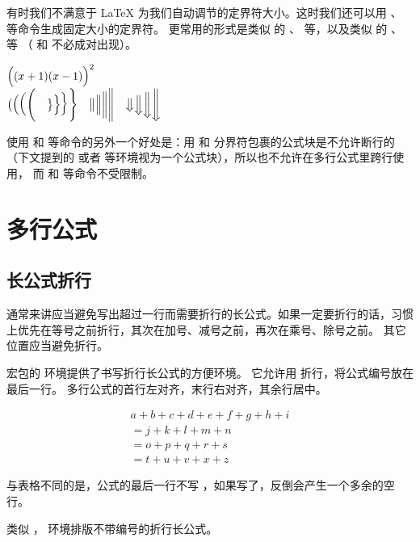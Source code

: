 有时我们不满意于 \LaTeX{} 为我们自动调节的定界符大小。这时我们还可以用 、 等命令生成固定大小的定界符。
更常用的形式是类似  的 、 等，以及类似  的 、 等
（ 和  不必成对出现）。
\begin{example}
$\Bigl((x+1)(x-1)\Bigr)^{2}$\\
$\bigl( \Bigl( \biggl( \Biggl( \quad
\bigr\} \Bigr\} \biggr\} \Biggr\} \quad
\big\| \Big\| \bigg\| \Bigg\| \quad
\big\Downarrow \Big\Downarrow
\bigg\Downarrow \Bigg\Downarrow$
\end{example}

使用  和  等命令的另外一个好处是：用  和  分界符包裹的公式块是不允许断行的
（下文提到的  或者  等环境视为一个公式块），所以也不允许在多行公式里跨行使用，
而  和  等命令不受限制。

\section{多行公式}\label{sec:multi-eqns}

\subsection{长公式折行}\label{subsec:multline}

通常来讲应当避免写出超过一行而需要折行的长公式。如果一定要折行的话，习惯上优先在等号之前折行，其次在加号、减号之前，再次在乘号、除号之前。
其它位置应当避免折行。

 宏包的  环境提供了书写折行长公式的方便环境。
它允许用 \crcmd{} 折行，将公式编号放在最后一行。
多行公式的首行左对齐，末行右对齐，其余行居中。
\begin{example}
\begin{multline}
a + b + c + d + e + f
+ g + h + i \\
= j + k + l + m + n\\
= o + p + q + r + s\\
= t + u + v + x + z
\end{multline}
\end{example}

与表格不同的是，公式的最后一行不写 \crcmd，如果写了，反倒会产生一个多余的空行。

类似 ， 环境排版不带编号的折行长公式。


